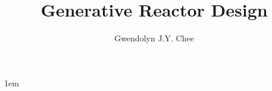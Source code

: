 \documentclass[edeposit,fullpage,11pt]{uiucthesis2009}
\title{Generative Reactor Design}
\author{Gwendolyn J.Y. Chee}
\begin{document}

%
\maketitle
\justify
\parindent 1em%

\frontmatter
%
\begin{abstract}
    
\end{abstract}

%
\tableofcontents

%

%

%



%

\mainmatter

%
	






%
%

\backmatter

%


\end{document}
